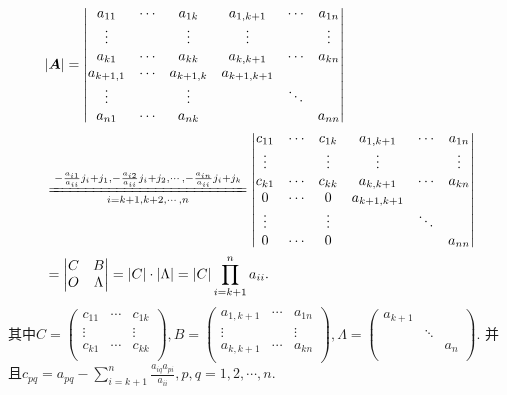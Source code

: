 \documentclass[../../main.tex]{subfiles}%
\begin{document}
\begin{solution}

\begin{align*}
&|\boldsymbol{A}|=\left| \begin{matrix}
a_{11}&		\cdots&		a_{1k}&		a_{1,k+1}&		\cdots&		a_{1n}\\
\vdots&		&		\vdots&		\vdots&		&		\vdots\\
a_{k1}&		\cdots&		a_{kk}&		a_{k,k+1}&		\cdots&		a_{kn}\\
a_{k+1,1}&		\cdots&		a_{k+1,k}&		a_{k+1,k+1}&		&		\\
\vdots&		&		\vdots&		&		\ddots&		\\
a_{n1}&		\cdots&		a_{nk}&		&		&		a_{nn}\\
\end{matrix} \right|
\\
&\xlongequal[i=k+1,k+2,\cdots ,n]{-\frac{a_{i1}}{a_{ii}}j_i+j_1,-\frac{a_{i2}}{a_{ii}}j_i+j_2,\cdots ,-\frac{a_{in}}{a_{ii}}j_i+j_k}\left| \begin{matrix}
c_{11}&		\cdots&		c_{1k}&		a_{1,k+1}&		\cdots&		a_{1n}\\
\vdots&		&		\vdots&		\vdots&		&		\vdots\\
c_{k1}&		\cdots&		c_{kk}&		a_{k,k+1}&		\cdots&		a_{kn}\\
0&		\cdots&		0&		a_{k+1,k+1}&		&		\\
\vdots&		&		\vdots&		&		\ddots&		\\
0&		\cdots&		0&		&		&		a_{nn}\\
\end{matrix} \right|
\\
&=\left| \begin{matrix}
C&		B\\
O&		\Lambda\\
\end{matrix} \right|=|C|\cdot |\Lambda |=|C|\prod_{i=k+1}^n{a_{ii}}.
\end{align*}
其中$C=\left( \begin{matrix}
c_{11}&		\cdots&		c_{1k}\\
\vdots&		&		\vdots\\
c_{k1}&		\cdots&		c_{kk}\\
\end{matrix} \right) ,B=\left( \begin{matrix}
a_{1,k+1}&		\cdots&		a_{1n}\\
\vdots&		&		\vdots\\
a_{k,k+1}&		\cdots&		a_{kn}\\
\end{matrix} \right) ,\Lambda =\left( \begin{matrix}
a_{k+1}&		&		\\
&		\ddots&		\\
&		&		a_n\\
\end{matrix} \right).$
并且$c_{pq}=a_{pq}-\sum_{i=k+1}^n{\frac{a_{iq}a_{pi}}{a_{ii}}},p,q=1,2,\cdots ,n$.

\end{solution}
\end{document}
